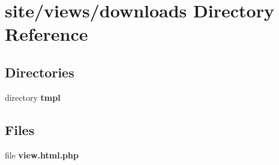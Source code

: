 \section{site/views/downloads Directory Reference}
\label{dir_1337ad11cc6f1010e80b52d9f893cf1b}
\subsection*{Directories}
\begin{DoxyCompactItemize}
\item 
directory \textbf{ tmpl}
\end{DoxyCompactItemize}
\subsection*{Files}
\begin{DoxyCompactItemize}
\item 
file \textbf{ view.\+html.\+php}
\end{DoxyCompactItemize}
